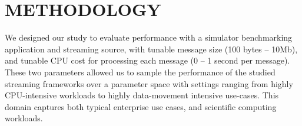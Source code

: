\documentclass[conference]{IEEEtran}
\begin{document}






\section{METHODOLOGY}\label{method}


We designed our study to evaluate performance with a simulator benchmarking application and streaming source, with tunable message size (100 bytes -- 10Mb), and tunable CPU cost for processing each message (0 -- 1 second per message). These two parameters  
allowed us to sample the performance of the studied streaming frameworks over a parameter space with settings ranging from highly CPU-intensive workloads to highly data-movement intensive use-cases. This domain captures both typical enterprise use cases, and scientific computing workloads.
\end{document}
